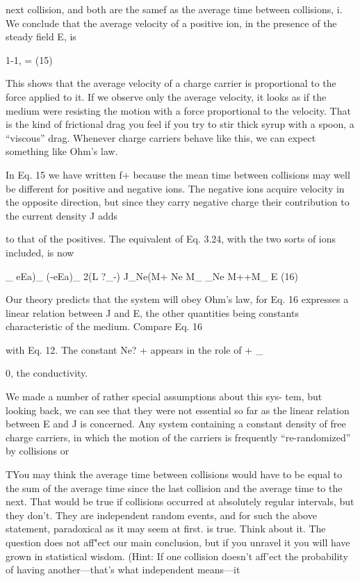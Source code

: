 next collision, and both are the samef as the average time between
collisions, i. We conclude that the average velocity of a positive ion,
in the presence of the steady field E, is

1-1, =  (15)
\begin{equation}
\end{equation}

This shows that the average velocity of a charge carrier is proportional
to the force applied to it. If we observe only the average
velocity, it looks as if the medium were resisting the motion with a
force proportional to the velocity. That is the kind of frictional drag
you feel if you try to stir thick syrup with a spoon, a ``viscous'' drag.
Whenever charge carriers behave like this, we can expect something
like Ohm's law.

In Eq. 15 we have written f+ because the mean time between collisions
may well be different for positive and negative ions. The negative
ions acquire velocity in the opposite direction, but since they
carry negative charge their contribution to the current density J adds

to that of the positives. The equivalent of Eq. 3.24, with the two sorts
of ions included, is now

_ eEa)_ (-eEa)_ 2(L ?_-)
J_Ne(M+ Ne M_ _Ne M++M_ E (16)
\begin{equation}
\end{equation}

Our theory predicts that the system will obey Ohm's law, for
Eq. 16 expresses a linear relation between J and E, the other quantities
being constants characteristic of the medium. Compare Eq. 16

with Eq. 12. The constant Ne?  +  appears in the role of
+ _

0, the conductivity.

We made a number of rather special assumptions about this sys-
tem, but looking back, we can see that they were not essential so far
as the linear relation between E and J is concerned. Any system
containing a constant density of free charge carriers, in which the
motion of the carriers is frequently ``re-randomized'' by collisions or

TYou may think the average time between collisions would have to be equal to the
sum of the average time since the last collision and the average time to the next. That
would be true if collisions occurred at absolutely regular intervals, but they don't. They
are independent random events, and for such the above statement, paradoxical as it may
seem at first. is true. Think about it. The question does not aff"ect our main conclusion,
but if you unravel it you will have grown in statistical wisdom. (Hint: If one collision
doesn't aff'ect the probability of having another---that's what independent means---it

